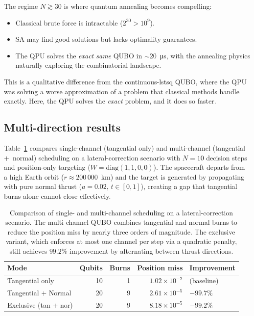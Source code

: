 \documentclass[8pt,a4paper]{article}
\theoremstyle{definition}
\theoremstyle{remark}
\begin{document}
The regime $N \gtrsim 30$ is where quantum annealing becomes
compelling:
\begin{itemize}[leftmargin=1.5em, itemsep=2pt]
  \item Classical brute force is intractable ($2^{30} > 10^9$).
  \item SA may find good solutions but lacks optimality guarantees.
  \item The QPU solves the \emph{exact same} QUBO in
    $\sim 20$~\si{\micro\second}, with the annealing physics
    naturally exploring the combinatorial landscape.
\end{itemize}
This is a qualitative difference from the continuous-lstsq QUBO, where
the QPU was solving a worse approximation of a problem that classical
methods handle exactly.  Here, the QPU solves the \emph{exact}
problem, and it does so faster.

\subsection{Multi-direction results}

Table~\ref{tab:multi-direction} compares single-channel (tangential
only) and multi-channel (tangential~$+$~normal) scheduling on a
lateral-correction scenario with $N = 10$ decision steps and
position-only targeting ($W = \mathrm{diag}(1,1,0,0)$).
The spacecraft departs from a high Earth orbit ($r \approx 200\,000$~km)
and the target is generated by propagating with pure normal thrust
($a = 0.02$, $t \in [0, 1]$), creating a gap that tangential burns
alone cannot close effectively.

\begin{table}[h]
\centering
\begin{tabular}{lrrrl}
  \toprule
  Mode & Qubits & Burns & Position miss & Improvement \\
  \midrule
  Tangential only         & 10 &  1 & $1.02 \times 10^{-2}$ & (baseline) \\
  Tangential $+$ Normal   & 20 &  9 & $2.61 \times 10^{-5}$ & $-99.7\%$ \\
  Exclusive (tan $+$ nor) & 20 &  9 & $8.18 \times 10^{-5}$ & $-99.2\%$ \\
  \bottomrule
\end{tabular}
\caption{Comparison of single- and multi-channel scheduling on a
  lateral-correction scenario.  The multi-channel QUBO combines
  tangential and normal burns to reduce the position miss by nearly
  three orders of magnitude.  The exclusive variant, which enforces at
  most one channel per step via a quadratic penalty, still achieves
  $99.2\%$ improvement by alternating between thrust directions.}
\label{tab:multi-direction}
\end{table}
\end{document}
